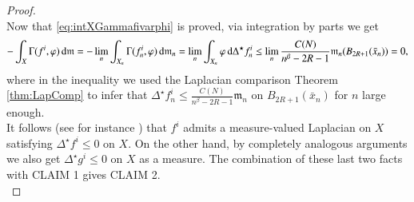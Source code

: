 \documentclass[11pt,reqno]{amsart}
\newcommand{\mm}{\mathfrak m}
\renewcommand{\d}{{\rm{d}}}
\theoremstyle{definition}
\theoremstyle{remark}
\theoremstyle{remark}
\theoremstyle{remark}
\theoremstyle{remark}
\theoremstyle{remark}
\theoremstyle{remark}
\theoremstyle{remark}
\begin{document}
\begin{proof}
\\Now that \eqref{eq:intXGammafivarphi} is proved,   via integration by parts we get
\begin{equation}\nonumber
-\int_X \Gamma(f^i,\varphi)\, \d\mm=- \lim_n \int_{X_n} \Gamma(f^i_n,\varphi)\, \d\mm_n= \lim_n \int_{X_n}  \varphi \, \d\Delta^\star f^i_n \leq \lim_{n} \frac{C(N)}  {n^{\beta}-2R-1} \mm_n(B_{2R+1}(\bar{x}_n))=0,
\end{equation}
where in the inequality we used the Laplacian comparison Theorem \ref{thm:LapComp} to infer that $\Delta^\star f^i_n \leq  \frac{C(N)}{n^{\beta}-2R-1} \mm_n$ on $B_{2R+1}(\bar{x}_n)$ for $n$ large enough.
\\It follows (see for instance \cite[Proposition 4.14]{Gigli12} ) that $f^i$ admits a measure-valued Laplacian on $X$ satisfying $\Delta^\star f^i \leq 0$ on $X$. On the other hand,  by completely analogous arguments we also get    $\Delta^\star g^i \leq 0$ on $X$ as a measure. The combination of these last two facts with CLAIM 1 gives CLAIM 2.
\\


\end{proof}
\end{document}
